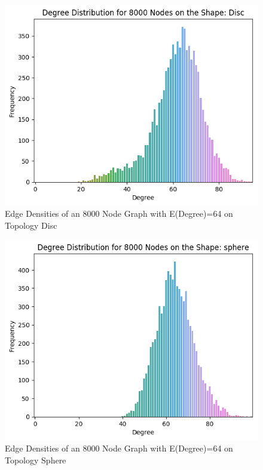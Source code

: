 \documentclass{article}
\begin{document}
  \begin{figure}[H]
    \centering
    \includegraphics[width=1 \textwidth]{disc/edge_density/8000_64.png}
    \caption{Edge Densities of an 8000 Node Graph with E(Degree)=64 on Topology Disc}
  \end{figure}

  \begin{figure}[H]
    \centering
    \includegraphics[width=1 \textwidth]{sphere/edge_density/8000_64.png}
    \caption{Edge Densities of an 8000 Node Graph with E(Degree)=64 on Topology Sphere}
  \end{figure}
\end{document}
